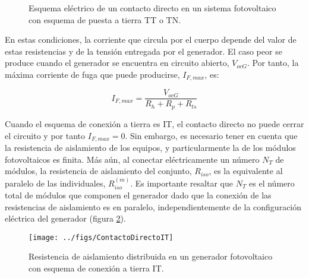 %
\begin{figure}
\hfill{}\hfill{}\hfill{}\hfill{}

\caption{\label{fig:ContactoDirectoTT_TN}Esquema eléctrico de un contacto
directo en un sistema fotovoltaico con esquema de puesta a tierra
TT o TN.}

\end{figure}


En estas condiciones, la corriente que circula por el cuerpo depende
del valor de estas resistencias y de la tensión entregada por el generador.
El caso peor se produce cuando el generador se encuentra en circuito
abierto, $V_{ocG}$. Por tanto, la máxima corriente de fuga que puede
producirse, $I_{F,max}$,
es:

\begin{equation}
I_{F,max}=\frac{V_{ocG}}{R_{h}+R_{p}+R_{ts}}\label{eq:IfmaxTT}\end{equation}


Cuando el esquema de conexión a tierra es IT, el contacto directo
no puede cerrar el circuito y por tanto $I_{F,max}=0$. Sin embargo,
es necesario tener en cuenta que la resistencia de aislamiento de
los equipos, y particularmente la de los módulos fotovoltaicos es
finita. Más aún, al conectar eléctricamente un número $N_{T}$
de módulos, la resistencia de aislamiento del conjunto, $R_{iso}$,
es la equivalente al paralelo de las individuales, $R_{iso}^{(m)}$.
Es importante resaltar que $N_{T}$ es el número total de módulos
que componen el generador dado que la conexión de las resistencias
de aislamiento es en paralelo, independientemente de la configuración
eléctrica del generador (figura \ref{fig:RisoDistribuidaIT}). 

%
\begin{figure}
\texttt{[image: ../figs/ContactoDirectoIT]}

\caption{\label{fig:RisoDistribuidaIT}Resistencia de aislamiento distribuida
en un generador fotovoltaico con esquema de conexión a tierra IT.}

\end{figure}


